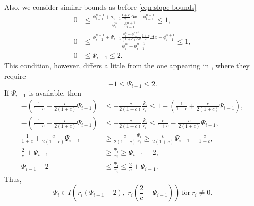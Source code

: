 \documentclass[../thesis.tex]{subfiles}
\begin{document}
\begin{remark}
\begin{equation}
\end{equation}
Also, we consider similar bounds as before \eqref{eqn:slope-bounds}
\begin{equation}
    \begin{split}\label{eqn: Frolkovic - psi bounds}
        0
        &\leq
        \frac{\phi_{i-1}^{n+1}
        +\sigma_{i-1}\frac{1+c}{2}\Delta x
        - \phi_{i-1}^{n+1}}{\phi_{i}^{n} - \phi_{i-1}^{n+1}}
        \leq
        1,
        \\
        0
        &\leq
        \frac{\phi_{i-1}^{n+1}
        +\Psi_{i-1}
        \frac{\phi_{i}^{n}-\phi_{i-1}^{n+1}}
        {(1+c)\Delta x}\frac{1+c}{2}\Delta x
        - \phi_{i-1}^{n+1}}{\phi_{i}^{n} - \phi_{i-1}^{n+1}}
        \leq
        1,
        \\
        0
        &\leq
        \Psi_{i-1}
        \leq
        2.
    \end{split}
\end{equation}
This condition, however, differs a little from the one appearing in \cite{2023_Frolkovic}, where they require
\begin{equation}
    -1
    \leq
    \Psi_{i-1}
    \leq
    2.
\end{equation}
If \(\Psi_{i-1}\) is available, then
\begin{equation}
    \begin{split}
        -\left(
            \frac{1}{1+c} + \frac{c}{2(1+c)}\Psi_{i-1} \right)
        &\leq
        -\frac{c}{2(1+c)}
        \frac{\Psi_{i}}{r_{i}}
        \leq
        1-\left(
            \frac{1}{1+c} + \frac{c}{2(1+c)}\Psi_{i-1} \right),
        \\
        -\left(
            \frac{1}{1+c} + \frac{c}{2(1+c)}\Psi_{i-1} \right)
        &\leq
        -\frac{c}{2(1+c)}
        \frac{\Psi_{i}}{r_{i}}
        \leq
        \frac{c}{1+c} - \frac{c}{2(1+c)}\Psi_{i-1},
        \\
        \frac{1}{1+c} + \frac{c}{2(1+c)}\Psi_{i-1}
        &\geq
        \frac{c}{2(1+c)}
        \frac{\Psi_{i}}{r_{i}}
        \geq
        \frac{c}{2(1+c)}\Psi_{i-1} - \frac{c}{1+c},
        \\
        \frac{2}{c} + \Psi_{i-1}
        &\geq
        \frac{\Psi_{i}}{r_{i}}
        \geq
        \Psi_{i-1} - 2,
        \\
        \Psi_{i-1} - 2
        &\leq
        \frac{\Psi_{i}}{r_{i}}
        \leq
        \frac{2}{c} + \Psi_{i-1}.
    \end{split}
\end{equation}
Thus,
\begin{equation}
    \Psi_{i}
    \in
    I
    \left( r_{i}\left(\Psi_{i-1} - 2\right),
    ~r_{i}\left( \frac{2}{c} + \Psi_{i-1} \right)
    \right)\ \text{for}\ r_{i} \neq 0.
\end{equation}


\end{remark}
\end{document}
